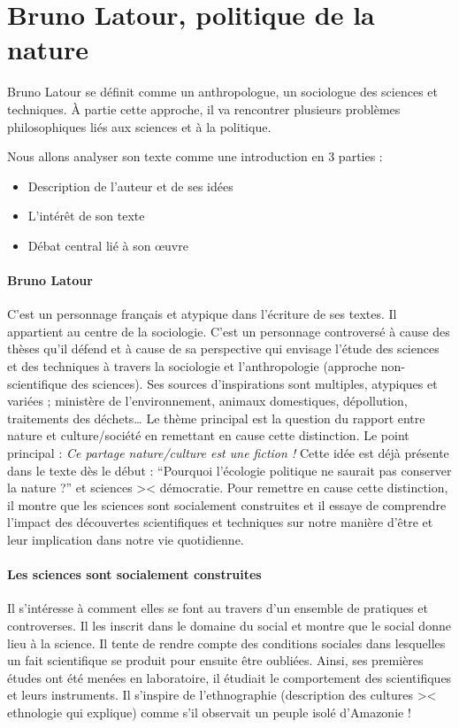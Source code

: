 \part{Bruno Latour, politique de la nature}
Bruno Latour se définit comme un anthropologue, un sociologue des sciences et techniques.
À partie cette approche, il va rencontrer plusieurs problèmes philosophiques liés aux sciences et à la politique.

Nous allons analyser son texte comme une introduction en 3 parties :
\begin{itemize}
	\item Description de l'auteur et de ses idées
	\item L'intérêt de son texte
	\item Débat central lié à son œuvre
\end{itemize}

\subsection{Bruno Latour}
C'est un personnage français et atypique dans l'écriture de ses textes.
Il appartient au centre de la sociologie.
C'est un personnage controversé à cause des thèses qu'il défend et à cause de sa perspective qui envisage l'étude des sciences et des techniques à travers la sociologie et l'anthropologie (approche non-scientifique des sciences).
Ses sources d'inspirations sont multiples, atypiques et variées ; ministère de l'environnement, animaux domestiques, dépollution, traitements des déchets… Le thème principal est la question du rapport entre nature et culture/société en remettant en cause cette distinction.
Le point principal : \emph{Ce partage nature/culture est une fiction !} Cette idée est déjà présente dans le texte dès le début :  ``Pourquoi l'écologie politique ne saurait pas conserver la nature ?'' et sciences >< démocratie.
Pour remettre en cause cette distinction, il montre que les sciences sont socialement construites et il essaye de comprendre l'impact des découvertes scientifiques et techniques sur notre manière d'être et leur implication dans notre vie quotidienne.

\subsection{Les sciences sont socialement construites}
Il s'intéresse à comment elles se font au travers d'un ensemble de pratiques et controverses.
Il les inscrit dans le domaine du social et montre que le social donne lieu à la science.
Il tente de rendre compte des conditions sociales dans lesquelles un fait scientifique se produit pour ensuite être oubliées.
Ainsi, ses premières études ont été menées en laboratoire, il étudiait le comportement des scientifiques et leurs instruments.
Il s'inspire de l'ethnographie (description des cultures >< ethnologie qui explique) comme s'il observait un peuple isolé d'Amazonie !

